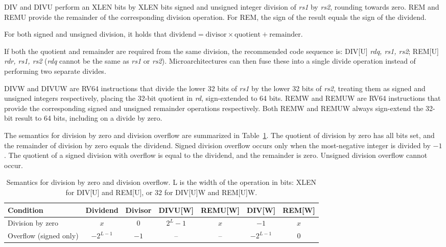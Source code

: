DIV and DIVU perform an XLEN bits by XLEN bits signed and unsigned integer
division of {\em rs1} by {\em rs2}, rounding towards zero.
REM and REMU provide the remainder of the corresponding division operation.
For REM, the sign of the result equals the sign of the dividend.

\begin{commentary}
For both signed and unsigned division, it holds that
\mbox{$\textrm{dividend} = \textrm{divisor} \times \textrm{quotient} + \textrm{remainder}$}.
\end{commentary}

If both the quotient and remainder
are required from the same division, the recommended code sequence is:
DIV[U] {\em rdq, rs1, rs2}; REM[U] {\em rdr, rs1, rs2} ({\em rdq}
cannot be the same as {\em rs1} or {\em rs2}).  Microarchitectures can
then fuse these into a single divide operation instead of performing
two separate divides.

DIVW and DIVUW are RV64 instructions that divide the
lower 32 bits of {\em rs1} by the lower 32 bits of {\em rs2}, treating
them as signed and unsigned integers respectively, placing the 32-bit
quotient in {\em rd}, sign-extended to 64 bits.  REMW and REMUW
are RV64 instructions that provide the corresponding
signed and unsigned remainder operations respectively. Both REMW and
REMUW always sign-extend the 32-bit result to 64 bits, including on a
divide by zero.

The semantics for division by zero and division overflow are summarized in
Table~\ref{tab:divby0}.  The quotient of division by zero has all bits set, and
the remainder of division by zero equals the dividend.  Signed division overflow
occurs only when the most-negative integer is divided by $-1$.  The quotient of
a signed division with overflow is equal to the dividend, and the remainder is
zero. Unsigned division overflow cannot occur.

\begin{table}[h]
\center
\begin{tabular}{|l|c|c||c|c|c|c|}
\hline
Condition              & Dividend   & Divisor & DIVU[W]   & REMU[W] & DIV[W]     & REM[W] \\ \hline
Division by zero       & $x$        & 0       & $2^{L}-1$ & $x$     & $-1$       & $x$    \\
Overflow (signed only) & $-2^{L-1}$ & $-1$    & --        & --      & $-2^{L-1}$ & 0      \\
\hline
\end{tabular}
\caption{Semantics for division by zero and division overflow.
L is the width of the operation in bits: XLEN for DIV[U] and REM[U], or
32 for DIV[U]W and REM[U]W.}
\label{tab:divby0}
\end{table}


